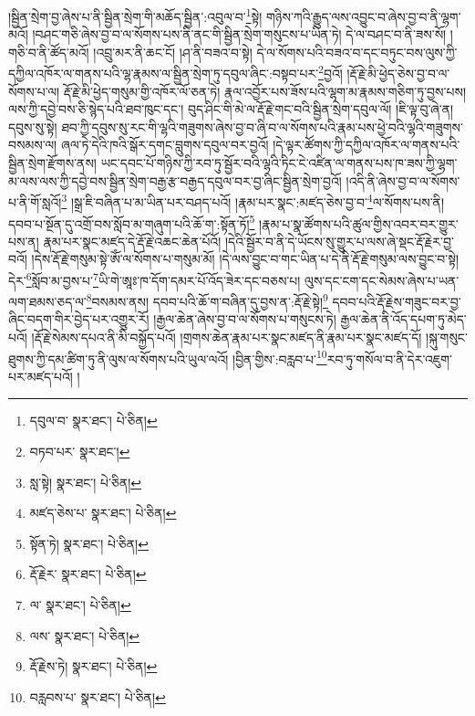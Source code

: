 །སྦྱིན་སྲེག་བྱ་ཞེས་པ་ནི་སྦྱིན་སྲེག་གི་མཆོད་སྦྱིན་:འབུལ་བ་\footnote{དབུལ་བ་  སྣར་ཐང་།  པེ་ཅིན། }སྟེ། གཉིས་ཀའི་རྒྱུད་ལས་འབྱུང་བ་ཞེས་བྱ་བ་ནི་ལྷག་མའོ། །བཤང་གཅི་ཞེས་བྱ་བ་ལ་སོགས་པས་ནི་ནང་གི་སྦྱིན་སྲེག་གསུངས་པ་ཡིན་ཏེ། དེ་ལ་བཤང་བ་ནི་ཟས་སོ། །གཅི་བ་ནི་ཚོད་མའོ། །འབྲུ་མར་ནི་ཆང་ངོ། །ཤ་ནི་བཟའ་བ་སྟེ། དེ་ལ་སོགས་པའི་བཟའ་བ་དང་བཏུང་བས་ལུས་ཀྱི་དཀྱིལ་འཁོར་ལ་གནས་པའི་ལྷ་རྣམས་ལ་སྦྱིན་སྲེག་ཏུ་དབུལ་ཞིང་:བསྟབ་པར་\footnote{བཏབ་པར་  སྣར་ཐང་། }བྱའོ། །རྡོ་རྗེ་མི་ཕྱེད་ཅེས་བྱ་བ་ལ་སོགས་པ་ལ། རྡོ་རྗེ་མི་ཕྱེད་གསུམ་གྱི་འཁོར་ལོ་ཅན་ཏེ། རྣལ་འབྱོར་པས་ཟོས་པའི་ལྷག་མ་རྣམས་གཅིག་ཏུ་བྱས་པས། ལས་ཀྱི་དབྱེ་བས་ཅི་སྙེད་པའི་ཐབ་ཁུང་དང་། བུད་ཤིང་གི་མེ་ལ་རྡོ་རྗེ་གང་བའི་སྦྱིན་སྲེག་དབུལ་ལོ། །ཇི་ལྟ་བུ་ཞེ་ན། དབུས་སུ་སྟེ། ཐབ་ཀྱི་དབུས་སུ་རང་གི་ལྷའི་གཟུགས་ཞེས་བྱ་བ་ཞི་བ་ལ་སོགས་པའི་རྣམ་པས་ཕྱེ་བའི་ལྷའི་གཟུགས་བསམས་ལ། ཞལ་ཏེ་དེའི་ཁའི་སྒོར་དགང་བླུགས་དབུལ་བར་བྱའོ། །དེ་ལྟར་ཚོགས་ཀྱི་དཀྱིལ་འཁོར་ལ་གནས་པའི་སྦྱིན་སྲེག་རྫོགས་ནས། ཡང་དབང་པོ་གཉིས་ཀྱི་རབ་ཏུ་སྦྱོར་བའི་ལྷའི་ཏིང་ངེ་འཛིན་ལ་གནས་པས་ཁ་ཟས་ཀྱི་ལྷག་མ་ལས་ལས་ཀྱི་དབྱེ་བས་སྦྱིན་སྲེག་བརྒྱ་རྩ་བརྒྱད་དབུལ་བར་བྱ་ཞིང་སྦྱིན་སྲེག་བྱའོ། །འདི་ནི་ཞེས་བྱ་བ་ལ་སོགས་པ་ནི་གོ་སླའོ།\footnote{སླ་སྟེ།  སྣར་ཐང་།  པེ་ཅིན། } །སྒྲ་ཇི་བཞིན་པ་མ་ཡིན་པར་བཤད་པའོ། །རྣམ་པར་སྣང་:མཛད་ཅེས་བྱ་བ་\footnote{མཛད་ཅེས་པ་  སྣར་ཐང་།  པེ་ཅིན། }ལ་སོགས་པས་ནི། དབབ་པ་སྔོན་དུ་འགྲོ་བས་སློབ་མ་གཞུག་པའི་ཆོ་ག་:སྟོན་ཏོ།\footnote{སྟོན་ཏེ།  སྣར་ཐང་།  པེ་ཅིན། } །རྣམ་པ་སྣ་ཚོགས་པའི་ཚུལ་གྱིས་འབར་བར་གྱུར་པས་ན། རྣམ་པར་སྣང་མཛད་དེ་རྡོ་རྗེ་འཆང་ཆེན་པོའོ། །དེའི་སྦྱོར་བ་ནི་དེ་ཡོངས་སུ་གྱུར་པ་ལས་ཞེ་སྡང་རྡོ་རྗེར་བྱ་བའོ། །དེས་རྡོ་རྗེ་གསུམ་སྟེ་ཨོཾ་ལ་སོགས་པ་གསུམ་མོ། །དེ་ལས་བྱུང་བ་གང་ཡིན་པ་དེ་ནི་རྡོ་རྗེ་གསུམ་ལས་བྱུང་བ་སྟེ། དེར་\footnote{རྡོ་རྗེར་  སྣར་ཐང་།  པེ་ཅིན། }སློབ་མ་བྱས་པ་\footnote{ལ་  སྣར་ཐང་།  པེ་ཅིན། }ཡི་གེ་ཨཱཿ་ཁ་དོག་དམར་པོ་འོད་ཟེར་དང་བཅས་པ། ལུས་དང་ངག་དང་སེམས་ཞེས་པ་ཡན་ལག་ཐམས་ཅད་ལ་\footnote{ལས་  སྣར་ཐང་།  པེ་ཅིན། }བསམས་ནས། དབབ་པའི་ཆོ་ག་བཞིན་དུ་བྱས་ན་:རྡོ་རྗེ་སྟེ།\footnote{རྡོ་རྗེས་ཏེ།  སྣར་ཐང་།  པེ་ཅིན། } དབབ་པའི་རྡོ་རྗེས་གཟུང་བར་བྱ་ཞིང་བདག་གིར་བྱེད་པར་འགྱུར་རོ། །རྒྱལ་ཆེན་ཞེས་བྱ་བ་ལ་སོགས་པ་གསུངས་ཏེ། རྒྱལ་ཆེན་ནི་འོད་དཔག་ཏུ་མེད་པའོ། །རྡོ་རྗེ་སེམས་དཔའ་ནི་མི་བསྐྱོད་པའོ། །གྲགས་ཆེན་རྣམ་པར་སྣང་མཛད་ནི་རྣམ་པར་སྣང་མཛད་དོ། །སྐུ་གསུང་ཐུགས་ཀྱི་དམ་ཚིག་ཏུ་ནི་ལུས་ལ་སོགས་པའི་ཡུལ་ལའོ། །བྱིན་གྱིས་:བརླབ་པ་\footnote{བརླབས་པ་  སྣར་ཐང་།  པེ་ཅིན། }རབ་ཏུ་གསོལ་བ་ནི་དེར་འཇུག་པར་མཛད་པའོ། །
